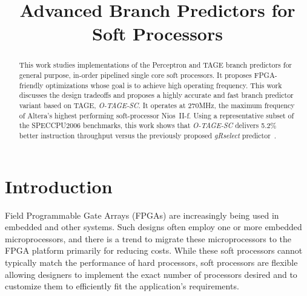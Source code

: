 \documentclass[conference]{IEEEtran}
\begin{document}
\title{Advanced Branch Predictors for Soft Processors}


\author{
}

\maketitle


\begin{abstract}
This work studies implementations of the Perceptron \cite{perceptron} and TAGE \cite{tage} branch predictors for general purpose, in-order pipelined single core soft processors. It proposes FPGA-friendly optimizations whose goal is to achieve high operating frequency. This work discusses the design tradeoffs and proposes a highly accurate and fast branch predictor variant based on TAGE, \textit{O-TAGE-SC}. It operates at 270MHz, the maximum frequency of Altera's highest performing soft-processor Nios~II-f. Using a representative subset of the SPECCPU2006 benchmarks, this work shows that \textit{O-TAGE-SC} delivers 5.2\% better instruction throughput versus the previously proposed \textit{gRselect} predictor~\cite{grselect}.
\end{abstract}

\IEEEpeerreviewmaketitle


\section{Introduction}
\label{sec:intro}
Field Programmable Gate Arrays (FPGAs) are increasingly being used in embedded and other systems. Such designs often employ one or more embedded microprocessors, and there is a trend to migrate these microprocessors to the FPGA platform primarily for reducing costs. While these soft processors cannot typically match the performance of hard processors, soft processors are flexible allowing designers to implement the exact number of processors desired and to customize them to efficiently fit the application's requirements.
\end{document}
